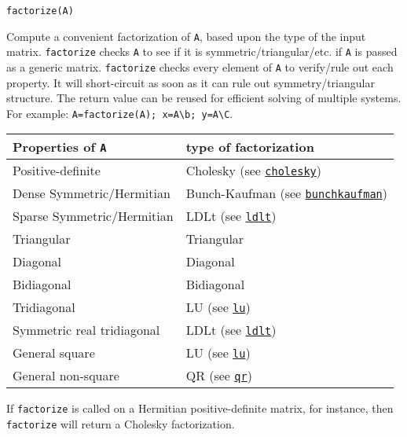 \begin{adjustwidth}{2em}{0pt}


\begin{verbatim}
factorize(A)
\end{verbatim}

Compute a convenient factorization of \texttt{A}, based upon the type of the input matrix. \texttt{factorize} checks \texttt{A} to see if it is symmetric/triangular/etc. if \texttt{A} is passed as a generic matrix. \texttt{factorize} checks every element of \texttt{A} to verify/rule out each property. It will short-circuit as soon as it can rule out symmetry/triangular structure. The return value can be reused for efficient solving of multiple systems. For example: \texttt{A=factorize(A); x=A{\textbackslash}b; y=A{\textbackslash}C}.


\begin{table}[h]

\begin{tabulary}{\linewidth}{|L|L|}
\hline
Properties of \texttt{A} & type of factorization \\
\hline
Positive-definite & Cholesky (see \hyperlink{7653413936706994771}{\texttt{cholesky}}) \\
\hline
Dense Symmetric/Hermitian & Bunch-Kaufman (see \hyperlink{17253210517333433448}{\texttt{bunchkaufman}}) \\
\hline
Sparse Symmetric/Hermitian & LDLt (see \hyperlink{8934377864822491393}{\texttt{ldlt}}) \\
\hline
Triangular & Triangular \\
\hline
Diagonal & Diagonal \\
\hline
Bidiagonal & Bidiagonal \\
\hline
Tridiagonal & LU (see \hyperlink{5672569096214810830}{\texttt{lu}}) \\
\hline
Symmetric real tridiagonal & LDLt (see \hyperlink{8934377864822491393}{\texttt{ldlt}}) \\
\hline
General square & LU (see \hyperlink{5672569096214810830}{\texttt{lu}}) \\
\hline
General non-square & QR (see \hyperlink{4122539696772350360}{\texttt{qr}}) \\
\hline
\end{tabulary}

\end{table}

If \texttt{factorize} is called on a Hermitian positive-definite matrix, for instance, then \texttt{factorize} will return a Cholesky factorization.


\end{adjustwidth}
